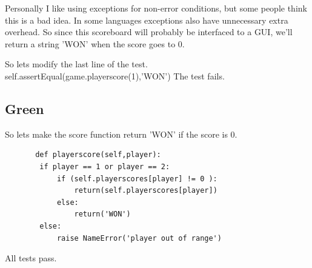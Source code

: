\documentclass{paper}
\begin{document}
Personally I like using exceptions for non-error conditions, but some
people think this is a bad idea. In some languages exceptions also
have unnecessary extra overhead. So since this scoreboard will
probably be interfaced to a GUI, we'll return a string 'WON' when the
score goes to 0.

So lets modify the last line of the test.
        self.assertEqual(game.playerscore(1),'WON')
The test fails. 

\subsection{Green}
 So lets make the score function return 'WON' if the score is 0.
 \begin{lstlisting}
       def playerscore(self,player):
        if player == 1 or player == 2:
            if (self.playerscores[player] != 0 ): 
                return(self.playerscores[player])
            else:
                return('WON')
        else:
            raise NameError('player out of range')
 \end{lstlisting}
All tests pass.
\end{document}
